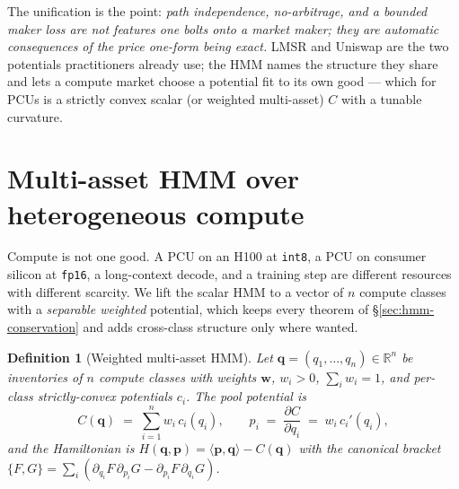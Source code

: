 \documentclass[11pt]{article}
\newtheorem{definition}{Definition}
\newcommand{\code}[1]{\texttt{#1}}
\newcommand{\R}{\ensuremath{\mathbb{R}}}
\newcommand{\inner}[2]{\ensuremath{\langle #1, #2\rangle}}
\begin{document}
The unification is the point: \emph{path independence, no-arbitrage, and a bounded
maker loss are not features one bolts onto a market maker; they are automatic
consequences of the price one-form being exact.} LMSR and Uniswap are the two
potentials practitioners already use; the HMM names the structure they share and
lets a compute market choose a potential fit to its own good --- which for PCUs is a
strictly convex scalar (or weighted multi-asset) $C$ with a tunable curvature.

\section{Multi-asset HMM over heterogeneous compute}
\label{sec:hmm-multi}

Compute is not one good. A PCU on an H100 at \code{int8}, a PCU on consumer
silicon at \code{fp16}, a long-context decode, and a training step are different
resources with different scarcity. We lift the scalar HMM to a vector of $n$
compute classes with a \emph{separable weighted} potential, which keeps every
theorem of \S\ref{sec:hmm-conservation} and adds cross-class structure only where
wanted.

\begin{definition}[Weighted multi-asset HMM]
\label{def:multi}
Let $\bm q=(q_1,\dots,q_n)\in\R^n$ be inventories of $n$ compute classes with
weights $\bm w$, $w_i>0$, $\sum_i w_i=1$, and per-class strictly-convex potentials
$c_i$. The pool potential is
\begin{equation}
C(\bm q) \;=\; \sum_{i=1}^n w_i\, c_i(q_i),
\qquad
p_i \;=\; \frac{\partial C}{\partial q_i} \;=\; w_i\, c_i'(q_i),
\label{eq:multic}
\end{equation}
and the Hamiltonian is $H(\bm q,\bm p)=\inner{\bm p}{\bm q}-C(\bm q)$ with the
canonical bracket $\{F,G\}=\sum_i(\partial_{q_i}F\,\partial_{p_i}G -
\partial_{p_i}F\,\partial_{q_i}G)$.
\end{definition}
\end{document}
